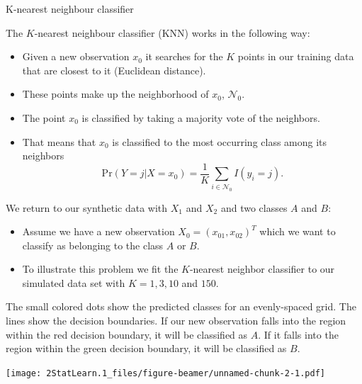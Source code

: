 \documentclass[ignorenonframetext,]{beamer}
\providecommand{\tightlist}{%
  \setlength{\itemsep}{0pt}\setlength{\parskip}{0pt}}
\begin{document}
\begin{frame}

\begin{block}{K-nearest neighbour classifier}

The \(K\)-nearest neighbour classifier (KNN) works in the following way:

\begin{itemize}
\tightlist
\item
  Given a new observation \(x_0\) it searches for the \(K\) points in
  our training data that are closest to it (Euclidean distance).
\item
  These points make up the neighborhood of \(x_0\), \(\mathcal{N}_0\).
\item
  The point \(x_0\) is classified by taking a majority vote of the
  neighbors.
\item
  That means that \(x_0\) is classified to the most occurring class
  among its neighbors
  \[\text{Pr}(Y=j | X = x_0) = \frac{1}{K} \sum_{i \in \mathcal{N}_0} I(y_i = j).\]
\end{itemize}

\end{block}

\end{frame}

\begin{frame}

We return to our synthetic data with \(X_1\) and \(X_2\) and two classes
\(A\) and \(B\):

\begin{itemize}
\tightlist
\item
  Assume we have a new observation \(X_0 = (x_{01}, x_{02})^T\) which we
  want to classify as belonging to the class \(A\) or \(B\).
\item
  To illustrate this problem we fit the \(K\)-nearest neighbor
  classifier to our simulated data set with \(K = 1, 3, 10\) and
  \(150\).
\end{itemize}

The small colored dots show the predicted classes for an evenly-spaced
grid. The lines show the decision boundaries. If our new observation
falls into the region within the red decision boundary, it will be
classified as \(A\). If it falls into the region within the green
decision boundary, it will be classified as \(B\).

\end{frame}

\begin{frame}

\texttt{[image: 2StatLearn.1\_files/figure-beamer/unnamed-chunk-2-1.pdf]}

\end{frame}
\end{document}
